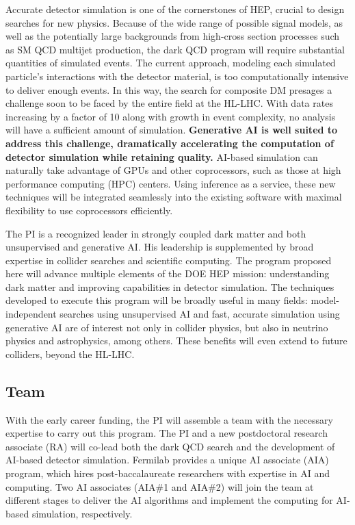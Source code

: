Accurate detector simulation is one of the cornerstones of HEP, crucial to design searches for new physics.
Because of the wide range of possible signal models,
as well as the potentially large backgrounds from high-cross section processes such as SM QCD multijet production,
the dark QCD program will require substantial quantities of simulated events.
The current approach, modeling each simulated particle's interactions with the detector material, is too computationally intensive to deliver enough events.
In this way, the search for composite DM presages a challenge soon to be faced by the entire field at the HL-LHC.
With data rates increasing by a factor of 10 along with growth in event complexity, no analysis will have a sufficient amount of simulation.
\textbf{Generative AI is well suited to address this challenge, dramatically accelerating the computation of detector simulation while retaining quality.}
AI-based simulation can naturally take advantage of GPUs and other coprocessors, such as those at high performance computing (HPC) centers.
Using inference as a service, these new techniques will be integrated seamlessly into the existing software with maximal flexibility to use coprocessors efficiently.

The PI is a recognized leader in strongly coupled dark matter and both unsupervised and generative AI.
His leadership is supplemented by broad expertise in collider searches and scientific computing.
The program proposed here will advance multiple elements of the DOE HEP mission: understanding dark matter and improving capabilities in detector simulation.
The techniques developed to execute this program will be broadly useful in many fields:
model-independent searches using unsupervised AI and fast, accurate simulation using generative AI are of interest
not only in collider physics, but also in neutrino physics and astrophysics, among others.
These benefits will even extend to future colliders, beyond the HL-LHC.

\subsection{Team}\label{subsec:team}

With the early career funding, the PI will assemble a team with the necessary expertise to carry out this program.
The PI and a new postdoctoral research associate (RA) will co-lead both the dark QCD search and the development of AI-based detector simulation.
Fermilab provides a unique AI associate (AIA) program, which hires post-baccalaureate researchers with expertise in AI and computing.
Two AI associates (AIA\#1 and AIA\#2) will join the team at different stages to deliver the AI algorithms and implement the computing for AI-based simulation, respectively.

